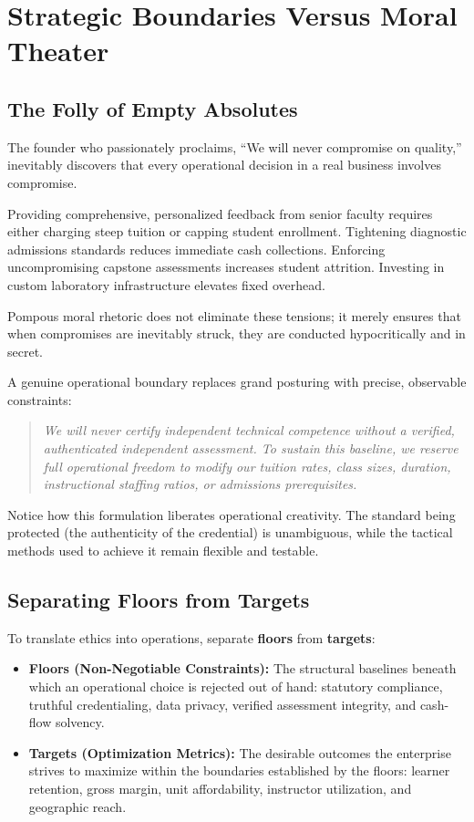 \section{Strategic Boundaries Versus Moral Theater}

\subsection{The Folly of Empty Absolutes}

The founder who passionately proclaims, ``We will never compromise on quality,'' inevitably discovers that every operational decision in a real business involves compromise.

Providing comprehensive, personalized feedback from senior faculty requires either charging steep tuition or capping student enrollment. Tightening diagnostic admissions standards reduces immediate cash collections. Enforcing uncompromising capstone assessments increases student attrition. Investing in custom laboratory infrastructure elevates fixed overhead.

Pompous moral rhetoric does not eliminate these tensions; it merely ensures that when compromises are inevitably struck, they are conducted hypocritically and in secret.

A genuine operational boundary replaces grand posturing with precise, observable constraints:

\begin{quote}
\itshape
We will never certify independent technical competence without a verified, authenticated independent assessment. To sustain this baseline, we reserve full operational freedom to modify our tuition rates, class sizes, duration, instructional staffing ratios, or admissions prerequisites.
\end{quote}

Notice how this formulation liberates operational creativity. The standard being protected (the authenticity of the credential) is unambiguous, while the tactical methods used to achieve it remain flexible and testable.

\subsection{Separating Floors from Targets}

To translate ethics into operations, separate \textbf{floors} from \textbf{targets}:

\begin{itemize}[leftmargin=11pt,itemsep=2pt,topsep=1.5pt,parsep=0pt]
  \item \textbf{Floors (Non-Negotiable Constraints):} The structural baselines beneath which an operational choice is rejected out of hand: statutory compliance, truthful credentialing, data privacy, verified assessment integrity, and cash-flow solvency.
  \item \textbf{Targets (Optimization Metrics):} The desirable outcomes the enterprise strives to maximize within the boundaries established by the floors: learner retention, gross margin, unit affordability, instructor utilization, and geographic reach.
\end{itemize}

